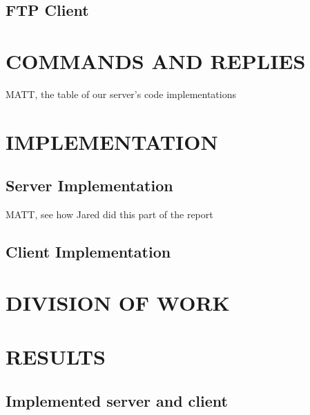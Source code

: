 \documentclass[10pt,twocolumn]{witseiepaper}
\begin{document}
\subsection{FTP Client}
\label{sec: FTP Client}


%
\section{COMMANDS AND REPLIES}
\label{sec: Commands and Replies}

MATT, the table of our server's code implementations



%
\section{IMPLEMENTATION}
\label{sec: Implementation}


\subsection{Server Implementation}
\label{sec: Server Implementation}
MATT, see how Jared did this part of the report


\subsection{Client Implementation}
\label{sec: Client Implementation}

%
\section{DIVISION OF WORK}
\label{sec: Division of Work}

%
\section{RESULTS}
\label{sec: Results}


\subsection{Implemented server and client}
\label{sec: Results implemented server}
\end{document}
